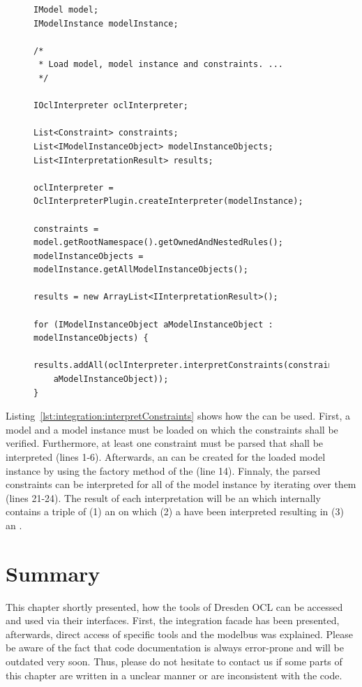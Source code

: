 \begin{figure}[!b]
\begin{lstlisting}[caption={How to interpret constraints.}, captionpos=b, label=lst:integration:interpretConstraints]
IModel model;
IModelInstance modelInstance;

/*
 * Load model, model instance and constraints. ...
 */

IOclInterpreter oclInterpreter;

List<Constraint> constraints;
List<IModelInstanceObject> modelInstanceObjects;
List<IInterpretationResult> results;

oclInterpreter = OclInterpreterPlugin.createInterpreter(modelInstance);

constraints = model.getRootNamespace().getOwnedAndNestedRules();
modelInstanceObjects = modelInstance.getAllModelInstanceObjects();

results = new ArrayList<IInterpretationResult>();

for (IModelInstanceObject aModelInstanceObject : modelInstanceObjects) {
  results.addAll(oclInterpreter.interpretConstraints(constraints,
  	aModelInstanceObject));
}
\end{lstlisting}
\end{figure}

Listing~\ref{lst:integration:interpretConstraints} shows how the 
 can be used. First, a model and a model instance must be 
loaded on which the constraints shall be verified. Furthermore, at least one 
constraint must be parsed that shall be interpreted (lines 1-6). Afterwards, an
 can be created for the loaded model instance by using 
the factory method of the  (line 14). Finnaly, the 
parsed constraints can be interpreted for all  of 
the model instance by iterating over them (lines 21-24). The result of each 
interpretation will be an  which internally contains
a triple of (1) an  on which (2) a  
have been interpreted resulting in (3) an .



\section{Summary}

This chapter shortly presented, how the tools of Dresden OCL can be accessed and
used via their interfaces. First, the integration facade has been presented, 
afterwards, direct access of specific tools and the modelbus was explained.
Please be aware of the fact that code documentation is always error-prone and
will be outdated very soon. Thus, please do not hesitate to contact us if some
parts of this chapter are written in a unclear manner or are inconsistent with
the code.
